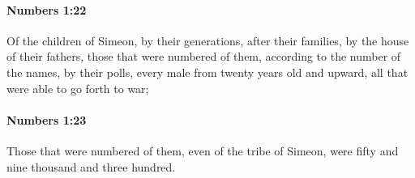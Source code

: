 		\paragraph{Numbers 1:22} %
			\label{NUMBERS-1-22}

			Of the children of Simeon, by their generations, after their families, by the house of their fathers, those that were numbered of them, according to the number of the names, by their polls, every male from twenty years old and upward, all that were able to go forth to war;


		\paragraph{Numbers 1:23} %
			\label{NUMBERS-1-23}

			Those that were numbered of them, even of the tribe of Simeon, were fifty and nine thousand and three hundred.

